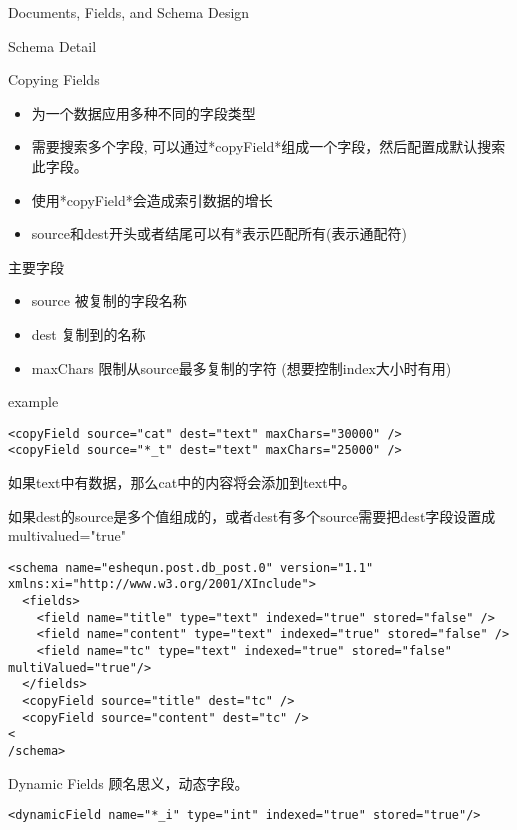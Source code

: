 \documentclass[presentation]{beamer}
\begin{document}
\begin{frame}[fragile,label={sec:orgc0e77e6}]{Documents, Fields, and Schema Design}
\begin{block}{Schema Detail}
\begin{block}{Copying Fields}
\begin{itemize}
\item 为一个数据应用多种不同的字段类型
\item 需要搜索多个字段, 可以通过*copyField*组成一个字段，然后配置成默认搜索此字段。
\item 使用*copyField*会造成索引数据的增长
\item source和dest开头或者结尾可以有*表示匹配所有(表示通配符)
\end{itemize}
\begin{block}{主要字段}
\begin{itemize}
\item source 被复制的字段名称
\item dest 复制到的名称
\item maxChars 限制从source最多复制的字符 (想要控制index大小时有用)
\end{itemize}
\end{block}

\begin{block}{example}
\begin{verbatim}
<copyField source="cat" dest="text" maxChars="30000" />
<copyField source="*_t" dest="text" maxChars="25000" />
\end{verbatim}
如果text中有数据，那么cat中的内容将会添加到text中。

如果dest的source是多个值组成的，或者dest有多个source需要把dest字段设置成multivalued="true"
\begin{verbatim}
<schema name="eshequn.post.db_post.0" version="1.1" xmlns:xi="http://www.w3.org/2001/XInclude">  
  <fields>  
    <field name="title" type="text" indexed="true" stored="false" />  
    <field name="content" type="text" indexed="true" stored="false" />  
    <field name="tc" type="text" indexed="true" stored="false" multiValued="true"/>  
  </fields>  
  <copyField source="title" dest="tc" />  
  <copyField source="content" dest="tc" />  
<
/schema>
\end{verbatim}
\end{block}
\end{block}


\begin{block}{Dynamic Fields}
顾名思义，动态字段。
\begin{verbatim}
<dynamicField name="*_i" type="int" indexed="true" stored="true"/>
\end{verbatim}
\end{block}



\end{block}
\end{frame}
\end{document}
